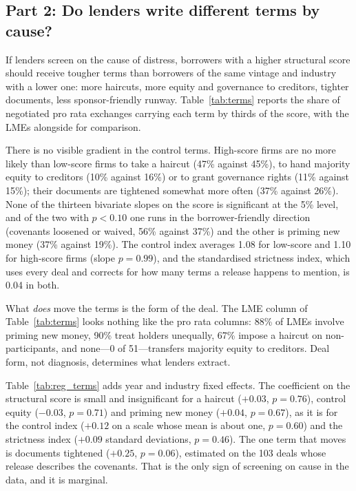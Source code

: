\documentclass[12pt]{article}
\begin{document}
\subsection{Part 2: Do lenders write different terms by cause?}
\label{sec:p2}

If lenders screen on the cause of distress, borrowers with a higher structural score should receive tougher terms than borrowers of the same vintage and industry with a lower one: more haircuts, more equity and governance to creditors, tighter documents, less sponsor-friendly runway. Table~\ref{tab:terms} reports the share of negotiated pro rata exchanges carrying each term by thirds of the score, with the LMEs alongside for comparison.



There is no visible gradient in the control terms. High-score firms are no more likely than low-score firms to take a haircut (47\% against 45\%), to hand majority equity to creditors (10\% against 16\%) or to grant governance rights (11\% against 15\%); their documents are tightened somewhat more often (37\% against 26\%). None of the thirteen bivariate slopes on the score is significant at the 5\% level, and of the two with $p < 0.10$ one runs in the borrower-friendly direction (covenants loosened or waived, 56\% against 37\%) and the other is priming new money (37\% against 19\%). The control index averages 1.08 for low-score and 1.10 for high-score firms (slope $p = 0.99$), and the standardised strictness index, which uses every deal and corrects for how many terms a release happens to mention, is 0.04 in both.

What \emph{does} move the terms is the form of the deal. The LME column of Table~\ref{tab:terms} looks nothing like the pro rata columns: 88\% of LMEs involve priming new money, 90\% treat holders unequally, 67\% impose a haircut on non-participants, and none---0 of 51---transfers majority equity to creditors. Deal form, not diagnosis, determines what lenders extract.

Table~\ref{tab:reg_terms} adds year and industry fixed effects. The coefficient on the structural score is small and insignificant for a haircut ($+0.03$, $p = 0.76$), control equity ($-0.03$, $p = 0.71$) and priming new money ($+0.04$, $p = 0.67$), as it is for the control index ($+0.12$ on a scale whose mean is about one, $p = 0.60$) and the strictness index ($+0.09$ standard deviations, $p = 0.46$). The one term that moves is documents tightened ($+0.25$, $p = 0.06$), estimated on the 103 deals whose release describes the covenants. That is the only sign of screening on cause in the data, and it is marginal.
\end{document}
